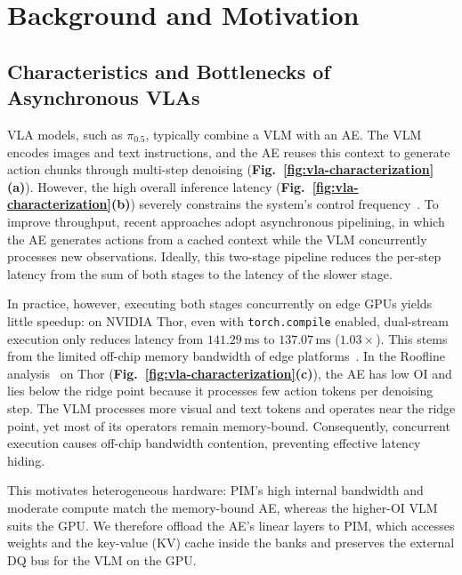\section{Background and Motivation}
\label{sec:background}

\subsection{Characteristics and Bottlenecks of Asynchronous VLAs}
\label{sec:background-a}
VLA models, such as $\pi_{0.5}$, typically combine a VLM with an AE. The VLM encodes images and text instructions, and the AE reuses this context to generate action chunks through multi-step denoising (\textbf{Fig.~\ref{fig:vla-characterization}(a)}). However, the high overall inference latency (\textbf{Fig.~\ref{fig:vla-characterization}(b)}) severely constrains the system's control frequency~\cite{edgevla}. To improve throughput, recent approaches adopt asynchronous pipelining, in which the AE generates actions from a cached context while the VLM concurrently processes new observations. Ideally, this two-stage pipeline reduces the per-step latency from the sum of both stages to the latency of the slower stage.

In practice, however, executing both stages concurrently on edge GPUs yields little speedup: on NVIDIA Thor, even with \texttt{torch.compile} enabled, dual-stream execution only reduces latency from $141.29\,\mathrm{ms}$ to $137.07\,\mathrm{ms}$ ($1.03\times$). This stems from the limited off-chip memory bandwidth of edge platforms~\cite{eaglevla}. In the Roofline analysis~\cite{roofline} on Thor (\textbf{Fig.~\ref{fig:vla-characterization}(c)}), the AE has low OI and lies below the ridge point because it processes few action tokens per denoising step. The VLM processes more visual and text tokens and operates near the ridge point, yet most of its operators remain memory-bound. Consequently, concurrent execution causes off-chip bandwidth contention, preventing effective latency hiding.

This motivates heterogeneous hardware: PIM's high internal bandwidth and moderate compute match the memory-bound AE, whereas the higher-OI VLM suits the GPU. We therefore offload the AE's linear layers to PIM, which accesses weights and the key-value (KV) cache inside the banks and preserves the external DQ bus for the VLM on the GPU.




